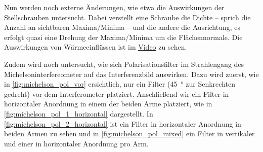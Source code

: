 \documentclass[ngerman]{scrartcl}
\begin{document}
Nun werden noch externe Änderungen, wie etwa die Auswirkungen der Stellschrauben untersucht. Dabei verstellt eine Schraube die Dichte -- sprich die Anzahl an sichtbaren Maxima/Minima -- und die andere die Ausrichtung, es erfolgt quasi eine Drehung der Maxima/Minima um die Flächennormale. 
Die Auswirkungen von Wärmeeinflüssen ist im \underline{\href{https://etschgi1.github.io/files/UNI_hosting/Misc/FP2/Interferometrie/Stoerungen.mp4}{Video}} zu sehen.

Zudem wird noch untersucht, wie sich Polarisationsfilter im Strahlengang des Michelsoninterfereometer auf das Interferenzbild auswirken. 
Dazu wird zuerst, wie in \autoref{fig:michelson_pol_vor} ersichtlich, nur ein Filter (\SI{45}{\degree} zur Senkrechten gedreht) vor dem Interferometer platziert. Anschließend wir ein Filter in horizontaler Anordnung in einem der beiden Arme platziert, wie in \autoref{fig:michelson_pol_1_horizontal} dargestellt. In \autoref{fig:michelson_pol_2_horizontal} ist ein Filter in horizontaler Anordnung in beiden Armen zu sehen und in \autoref{fig:michelson_pol_mixed} ein Filter in vertikaler und einer in horizontaler Anordnung pro Arm.
\setcapindent{0pt}
\end{document}
